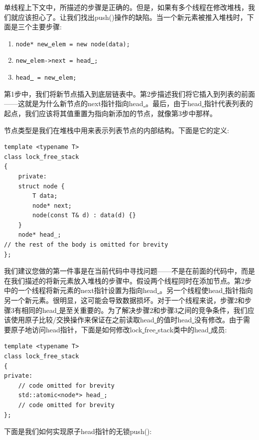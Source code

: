 单线程上下文中，所描述的步骤是正确的。但是，如果有多个线程在修改堆栈，我们就应该担心了。让我们找出push()操作的缺陷。当一个新元素被推入堆栈时，下面是三个主要步骤: \par

\begin{enumerate}
	\item \texttt{node* new\underline{ }elem = new node(data); }
	\item \texttt{new\underline{ }elem->next = head\underline{ }; }
	\item \texttt{head\underline{ } = new\underline{ }elem; }
\end{enumerate}

第1步中，我们将新节点插入到底层链表中。第2步描述我们将它插入到列表的前面——这就是为什么新节点的next指针指向head\underline{ }。最后，由于head\underline{ }指针代表列表的起点，我们应该将其值重置为指向新添加的节点，就像第3步中那样。 \par
节点类型是我们在堆栈中用来表示列表节点的内部结构。下面是它的定义: \par

\begin{lstlisting}[caption={}]
template <typename T>
class lock_free_stack
{
	private:
	struct node {
		T data;
		node* next;
		node(const T& d) : data(d) {}
	}
	node* head_;
// the rest of the body is omitted for brevity
};
\end{lstlisting}

我们建议您做的第一件事是在当前代码中寻找问题——不是在前面的代码中，而是在我们描述的将新元素放入堆栈的步骤中。假设两个线程同时在添加节点。第2步中的一个线程将新元素的next指针设置为指向head\underline{ }。另一个线程使head\underline{ }指针指向另一个新元素。很明显，这可能会导致数据损坏。对于一个线程来说，步骤2和步骤3有相同的head\underline{ }是至关重要的。为了解决步骤2和步骤3之间的竞争条件，我们应该使用原子比较/交换操作来保证在之前读取head\underline{ }的值时head\underline{ }没有修改。由于需要原子地访问head指针，下面是如何修改lock\underline{ }free\underline{ }stack类中的head\underline{ }成员: \par

\begin{lstlisting}[caption={}]
template <typename T>
class lock_free_stack
{
private:
	// code omitted for brevity
	std::atomic<node*> head_;
	// code omitted for brevity
};
\end{lstlisting}

下面是我们如何实现原子head\underline{}指针的无锁push(): \par

